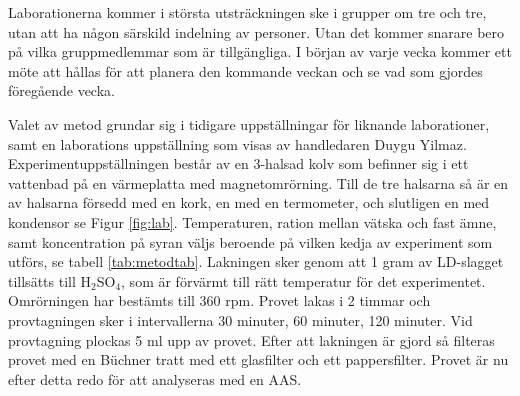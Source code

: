 \documentclass{article}
\begin{document}
Laborationerna kommer i största utsträckningen ske i grupper om tre och tre, utan att ha någon särskild indelning av personer. Utan det kommer snarare bero på vilka gruppmedlemmar som är tillgängliga. I början av varje vecka kommer ett möte att hållas för att planera den kommande veckan och se vad som gjordes föregående vecka. 

Valet av metod grundar sig i tidigare uppställningar för liknande laborationer, samt en laborations uppställning som visas av handledaren Duygu Yilmaz\cite{Aarabi-Karasgani2010}. Experimentuppställningen består av en 3-halsad kolv som befinner sig i ett vattenbad på en värmeplatta med magnetomrörning. Till de tre halsarna så är en av halsarna försedd med en kork, en med en termometer, och slutligen en med kondensor se Figur \ref{fig:lab}. Temperaturen, ration mellan vätska och fast ämne, samt koncentration på syran väljs beroende på vilken kedja av experiment som utförs, se tabell \ref{tab:metodtab}. Lakningen sker genom att 1 gram av LD-slagget tillsätts till H$_{2}$SO$_{4}$, som är förvärmt till rätt temperatur för det experimentet. Omrörningen har bestämts till 360 rpm. Provet lakas i 2 timmar och provtagningen sker i intervallerna 30 minuter, 60 minuter, 120 minuter. Vid provtagning plockas 5 ml upp av provet. Efter att lakningen är gjord så filteras provet med en Büchner tratt med ett glasfilter och ett pappersfilter. Provet är nu efter detta redo för att analyseras med en AAS. 
\end{document}
